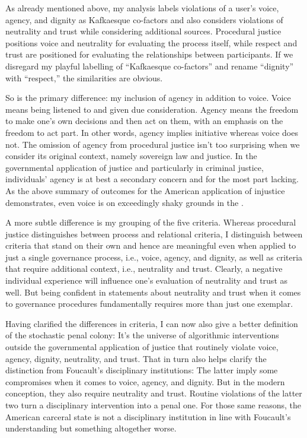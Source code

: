 As already mentioned above, my analysis labels violations of a user's voice,
agency, and dignity as Kafkaesque co-factors and also considers violations of
neutrality and trust while considering additional sources. Procedural justice
positions voice and neutrality for evaluating the process itself, while respect
and trust are positioned for evaluating the relationships between participants.
If we disregard my playful labelling of ``Kafkaesque co-factors'' and rename
``dignity'' with ``respect,'' the similarities are obvious.

So is the primary difference: my inclusion of agency in addition to voice. Voice
means being listened to and given due consideration. Agency means the freedom to
make one's own decisions and then act on them, with an emphasis on the freedom
to act part. In other words, agency implies initiative whereas voice does not.
The omission of agency from procedural justice isn't too surprising when we
consider its original context, namely sovereign law and justice. In the
governmental application of justice and particularly in criminal justice,
individuals' agency is at best a secondary concern and for the most part
lacking. As the above summary of outcomes for the American application of
injustice demonstrates, even voice is on exceedingly shaky grounds in the
.

A more subtle difference is my grouping of the five criteria. Whereas procedural
justice distinguishes between process and relational criteria, I distinguish
between criteria that stand on their own and hence are meaningful even when
applied to just a single governance process, i.e., voice, agency, and dignity,
as well as criteria that require additional context, i.e., neutrality and trust.
Clearly, a negative individual experience will influence one's evaluation of
neutrality and trust as well. But being confident in statements about neutrality
and trust when it comes to governance procedures fundamentally requires more
than just one exemplar.

Having clarified the differences in criteria, I can now also give a better
definition of the stochastic penal colony: It's the universe of algorithmic
interventions outside the governmental application of justice that routinely
violate voice, agency, dignity, neutrality, and trust. That in turn also helps
clarify the distinction from Foucault's disciplinary institutions: The latter
imply some compromises when it comes to voice, agency, and dignity. But in the
modern conception, they also require neutrality and trust. Routine violations of
the latter two turn a disciplinary intervention into a penal one. For those same
reasons, the American carceral state is not a disciplinary institution in line
with Foucault's understanding but something altogether worse.
